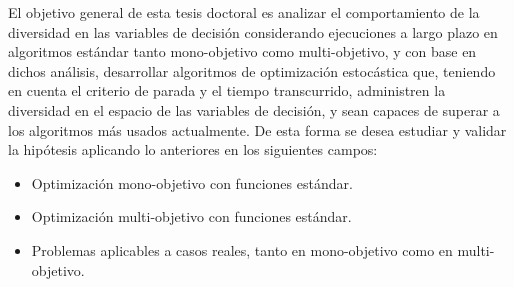 
El objetivo general de esta tesis doctoral es analizar el comportamiento de la diversidad en las variables de decisión 
considerando ejecuciones a largo plazo en algoritmos estándar tanto mono-objetivo como multi-objetivo, y con base en
dichos análisis, desarrollar algoritmos de optimización estocástica que, teniendo en cuenta el criterio de parada y el 
tiempo transcurrido, administren la diversidad en el espacio de las variables de decisión, y sean capaces de superar
a los algoritmos más usados actualmente.
%
De esta forma se desea estudiar y validar la hipótesis aplicando lo anteriores en los siguientes campos:
\begin{itemize}
	\item Optimización mono-objetivo con funciones estándar.
	\item Optimización multi-objetivo con funciones estándar.
	\item Problemas aplicables a casos reales, tanto en mono-objetivo como en multi-objetivo.
\end{itemize}
